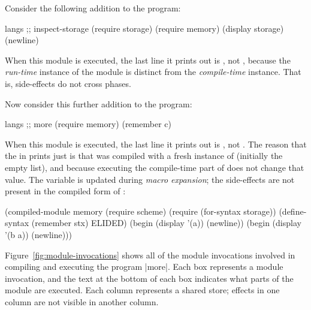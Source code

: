 \begin{schemeregion}
Consider the following addition to the program:
\begin{schemedisplay}
langs ;; inspect-storage
(require storage)
(require memory)
(display storage) (newline)
\end{schemedisplay}
When this module is executed, the last line it prints out is
\schemeresult{()}, not , because the
\emph{run-time} instance of the  module is distinct
from the \emph{compile-time} instance. That is, side-effects do not
cross phases.

Now consider this further addition to the program:
\begin{schemedisplay}
langs ;; more
(require memory)
(remember c)
\end{schemedisplay}
When this module is executed, the last line it prints out is
, not .
%
%
The reason that the  in  prints just 
 is that  was compiled with a fresh
instance of  (initially the empty list), and because
executing the compile-time part of  does not change
that value. The variable is updated during \emph{macro expansion};
the side-effects are not present in the compiled form of
:
\begin{schemedisplay}
(compiled-module memory
  (require scheme)
  (require (for-syntax storage))
  (define-syntax (remember stx) ELIDED)
  (begin (display '(a)) (newline))
  (begin (display '(b a)) (newline)))
\end{schemedisplay}

Figure~\ref{fig:module-invocations} shows all of the module invocations
involved in compiling and executing the program \scheme|more|. Each box represents
a module invocation, and the text at the bottom of each box indicates
what parts of the module are executed. Each column represents a shared
store; effects in one column are not visible in another column.


\end{schemeregion}

